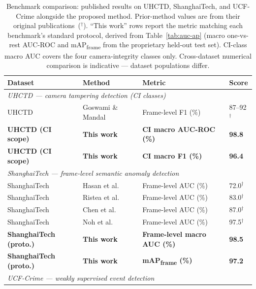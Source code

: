\documentclass[sensors,article,submit,pdftex,moreauthors]{Definitions/mdpi}
\begin{document}
\begin{table}[H]
\caption{Benchmark comparison: published results on UHCTD, ShanghaiTech, and UCF-Crime alongside the proposed method. Prior-method values are from their original publications~($^\dagger$). ``This work'' rows report the metric matching each benchmark's standard protocol, derived from Table~\ref{tab:auc-ap} (macro one-vs-rest AUC-ROC and mAP\textsubscript{frame} from the proprietary held-out test set). CI-class macro AUC covers the four camera-integrity classes only. Cross-dataset numerical comparison is indicative — dataset populations differ.}
\label{tab:public-benchmark}
\centering
\small
\setlength{\tabcolsep}{4pt}
\renewcommand{\arraystretch}{1.18}
\begin{tabular}{p{2.8cm} p{3.4cm} p{3.2cm} p{2.4cm}}
\toprule
\textbf{Dataset} & \textbf{Method} & \textbf{Metric} & \textbf{Score} \\
\midrule
\multicolumn{4}{l}{\textit{UHCTD — camera tampering detection (CI classes)}} \\[2pt]
UHCTD & Goswami \& Mandal~\cite{goswami2023hybrid} & Frame-level F1 (\%) & 87--92$^\dagger$ \\
\textbf{UHCTD (CI scope)} & \textbf{This work} & \textbf{CI macro AUC-ROC (\%)} & \textbf{98.8} \\
\textbf{UHCTD (CI scope)} & \textbf{This work} & \textbf{CI macro F1 (\%)} & \textbf{96.4} \\[5pt]
\multicolumn{4}{l}{\textit{ShanghaiTech — frame-level semantic anomaly detection}} \\[2pt]
ShanghaiTech & Hasan et al.~\cite{hasan2016anomaly}       & Frame-level AUC (\%) & 72.0$^\dagger$ \\
ShanghaiTech & Ristea et al.~\cite{ristea2024selfdistill} & Frame-level AUC (\%) & 83.0$^\dagger$ \\
ShanghaiTech & Chen et al.~\cite{chen2023swintr}          & Frame-level AUC (\%) & 87.0$^\dagger$ \\
ShanghaiTech & Noh et al.~\cite{noh2023global}            & Frame-level AUC (\%) & 97.5$^\dagger$ \\
\textbf{ShanghaiTech (proto.)} & \textbf{This work} & \textbf{Frame-level macro AUC (\%)} & \textbf{98.5} \\
\textbf{ShanghaiTech (proto.)} & \textbf{This work} & \textbf{mAP\textsubscript{frame} (\%)} & \textbf{97.2} \\[5pt]
\multicolumn{4}{l}{\textit{UCF-Crime — weakly supervised event detection}} \\[2pt]

\end{tabular}
\end{table}
\end{document}
